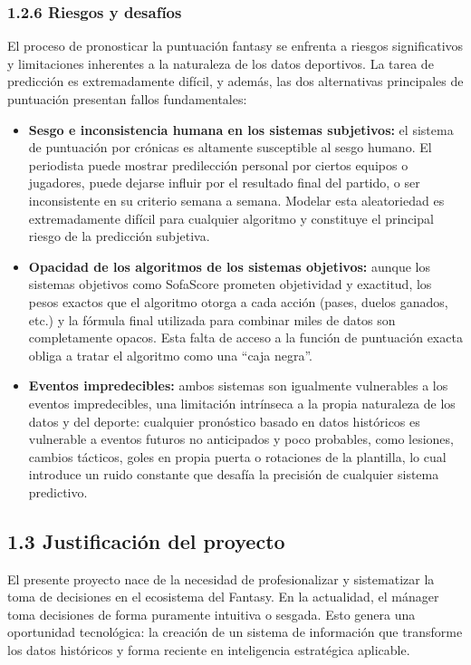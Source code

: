 \subsubsection{1.2.6 Riesgos y desafíos}

El proceso de pronosticar la puntuación fantasy se enfrenta a riesgos significativos y limitaciones 
inherentes a la naturaleza de los datos deportivos.
La tarea de predicción es extremadamente difícil, y además, las dos alternativas principales de 
puntuación presentan fallos fundamentales:

\begin{itemize}
\item \textbf{Sesgo e inconsistencia humana en los sistemas subjetivos:} el sistema de puntuación 
por crónicas es altamente susceptible al sesgo humano.
El periodista puede mostrar predilección personal por ciertos equipos o jugadores, puede dejarse 
influir por el resultado final del partido, o ser inconsistente en su criterio semana a semana.
Modelar esta aleatoriedad es extremadamente difícil para cualquier algoritmo y constituye el 
principal riesgo de la predicción subjetiva.

\item \textbf{Opacidad de los algoritmos de los sistemas objetivos:} aunque los sistemas objetivos 
como SofaScore prometen objetividad y exactitud, los pesos exactos que el algoritmo otorga a cada 
acción (pases, duelos ganados, etc.) y la fórmula final utilizada para combinar miles de datos son 
completamente opacos.
Esta falta de acceso a la función de puntuación exacta obliga a tratar el algoritmo como una 
``caja negra''.

\item \textbf{Eventos impredecibles:} ambos sistemas son igualmente vulnerables a los eventos 
impredecibles, una limitación intrínseca a la propia naturaleza de los datos y del deporte: 
cualquier pronóstico basado en datos históricos es vulnerable a eventos futuros no anticipados y 
poco probables, como lesiones, cambios tácticos, goles en propia puerta o rotaciones de la 
plantilla, lo cual introduce un ruido constante que desafía la precisión de cualquier sistema 
predictivo.
\end{itemize}

\subsection{1.3 Justificación del proyecto}

El presente proyecto nace de la necesidad de profesionalizar y sistematizar la toma de decisiones 
en el ecosistema del Fantasy.
En la actualidad, el mánager toma decisiones de forma puramente intuitiva o sesgada.
Esto genera una oportunidad tecnológica: la creación de un sistema de información que transforme 
los datos históricos y forma reciente en inteligencia estratégica aplicable.


